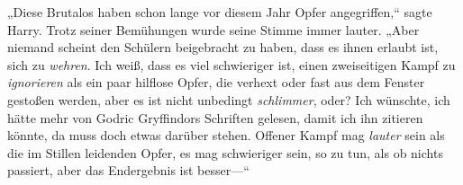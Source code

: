 „Diese Brutalos haben schon lange vor diesem Jahr Opfer angegriffen,“ sagte Harry. Trotz seiner Bemühungen wurde seine Stimme immer lauter. „Aber niemand scheint den Schülern beigebracht zu haben, dass es ihnen erlaubt ist, sich zu \emph{wehren}. Ich weiß, dass es viel schwieriger ist, einen zweiseitigen Kampf zu \emph{ignorieren} als ein paar hilflose Opfer, die verhext oder fast aus dem Fenster gestoßen werden, aber es ist nicht unbedingt \emph{schlimmer}, oder? Ich wünschte, ich hätte mehr von Godric Gryffindors Schriften gelesen, damit ich ihn zitieren könnte, da muss doch etwas darüber stehen. Offener Kampf mag \emph{lauter} sein als die im Stillen leidenden Opfer, es mag schwieriger sein, so zu tun, als ob nichts passiert, aber das Endergebnis ist besser—“

